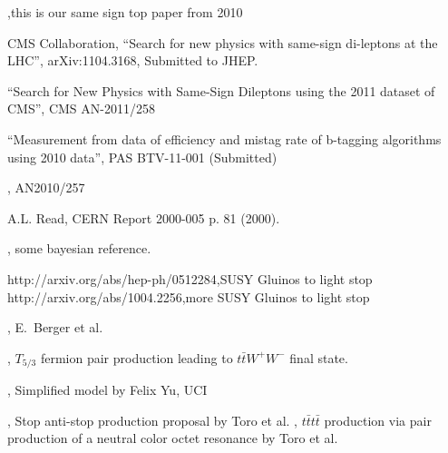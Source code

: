 \begin{thebibliography}{99}

,{this is our same sign top paper from 2010}

 {CMS Collaboration, ``Search for new physics with same-sign di-leptons at the LHC''}, arXiv:1104.3168, Submitted to JHEP.

 {``Search for New Physics with Same-Sign Dileptons using the 2011 dataset of CMS''}, CMS AN-2011/258

 {``Measurement from data of efficiency and mistag rate of b-tagging algorithms using 2010 data''}, PAS BTV-11-001 (Submitted)

, AN2010/257

 {A.L. Read, CERN Report 2000-005 p. 81 (2000).}

, some bayesian reference.

 { http://arxiv.org/abs/hep-ph/0512284},{SUSY Gluinos to light stop}
 { http://arxiv.org/abs/1004.2256},{more SUSY Gluinos to light stop}

, {E.~Berger et al.}

, { $T_{5/3}$ fermion pair production leading to $t\bar{t}W^+W^-$ final state.}

,{ Simplified model by Felix Yu, UCI}

, { Stop anti-stop production proposal by Toro et al. } 
, { $t\bar{t}t\bar{t}$ production via pair production of a neutral color octet resonance by Toro et al. } 

\end{thebibliography}








